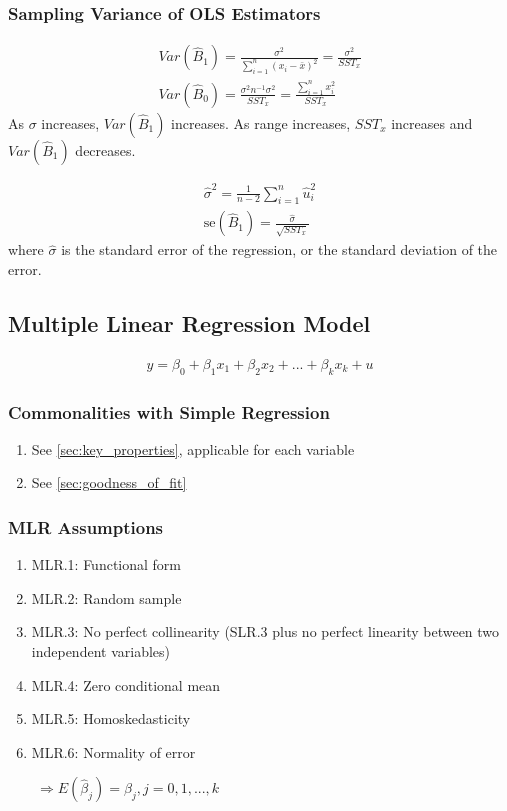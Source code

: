 \documentclass[12pt]{article}
\numberwithin{equation}{section}
\begin{document}
\subsubsection{Sampling Variance of OLS Estimators}
\begin{gather}
    Var(\hat{B}_1) = \frac{\sigma^2}{\sum_{i=1}^{n} (x_i - \bar{x})^2} = \frac{\sigma^2}{SST_x} \\
    Var(\hat{B}_0) = \frac{\sigma^2 n^{-1} \sigma^2}{SST_x} = \frac{\sum_{i=1}^{n} {x_i^2}}{SST_x}
\end{gather}
As $\sigma$ increases, $Var(\hat{B}_1)$ increases. As range increases, $SST_x$ increases and $Var(\hat{B}_1)$ decreases.

\begin{gather}
    \hat{\sigma}^2 = \frac{1}{n-2} \sum_{i=1}^{n} \hat{u}_i^2 \\
    \text{se}(\hat{B}_1) = \frac{\hat{\sigma}}{\sqrt{SST_x}}
\end{gather}
where $\hat{\sigma}$ is the standard error of the regression, or the standard deviation of the error.

\subsection{Multiple Linear Regression Model}
\begin{gather}
    y = \beta_0 + \beta_1 x_1 + \beta_2 x_2 + ... + \beta_k x_k + u
\end{gather}

\subsubsection{Commonalities with Simple Regression}
\begin{enumerate}
    \item See \ref{sec:key_properties}, applicable for each variable
    \item See \ref{sec:goodness_of_fit}
\end{enumerate}

\subsubsection{MLR Assumptions}
\begin{enumerate}
    \item MLR.1: Functional form
    \item MLR.2: Random sample
    \item MLR.3: No perfect collinearity (SLR.3 plus no perfect linearity between two independent variables)
    \item MLR.4: Zero conditional mean
    \item MLR.5: Homoskedasticity
    \item MLR.6: Normality of error
\end{enumerate}
$\qquad \Rightarrow E(\hat{\beta}_j) = \beta_j, j = 0, 1, ..., k$
\end{document}
